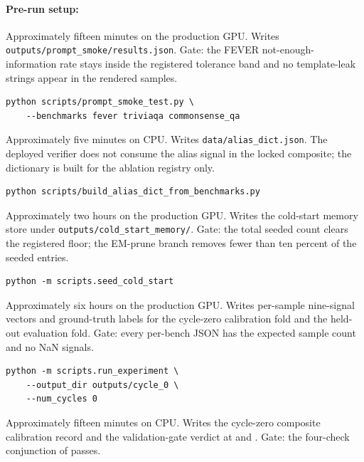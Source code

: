 \paragraph{Pre-run setup:}
\begin{description}[style=nextline,leftmargin=0pt]
\item[Prompt smoke test.] Approximately fifteen minutes on the production GPU. Writes \texttt{outputs/prompt\_smoke/results.json}. Gate: the FEVER not-enough-information rate stays inside the registered tolerance band and no template-leak strings appear in the rendered samples.
\begin{verbatim}
python scripts/prompt_smoke_test.py \
    --benchmarks fever triviaqa commonsense_qa
\end{verbatim}
\item[Alias-dictionary build.] Approximately five minutes on CPU. Writes \texttt{data/alias\_dict.json}. The deployed verifier does not consume the alias signal in the locked composite; the dictionary is built for the ablation registry only.
\begin{verbatim}
python scripts/build_alias_dict_from_benchmarks.py
\end{verbatim}
\item[Cold-start seeding.] Approximately two hours on the production GPU. Writes the cold-start memory store under \texttt{outputs/cold\_start\_memory/}. Gate: the total seeded count clears the registered floor; the EM-prune branch removes fewer than ten percent of the seeded entries.
\begin{verbatim}
python -m scripts.seed_cold_start
\end{verbatim}
\item[Cycle-zero baseline evaluation and calibration fold scoring.] Approximately six hours on the production GPU. Writes per-sample nine-signal vectors and ground-truth labels for the cycle-zero calibration fold and the held-out evaluation fold. Gate: every per-bench JSON has the expected sample count and no NaN signals.
\begin{verbatim}
python -m scripts.run_experiment \
    --output_dir outputs/cycle_0 \
    --num_cycles 0
\end{verbatim}
\item[Composite calibration fit and validation gate.] Approximately fifteen minutes on CPU. Writes the cycle-zero composite calibration record and the validation-gate verdict at  and . Gate: the four-check conjunction of  passes.

\end{description}
